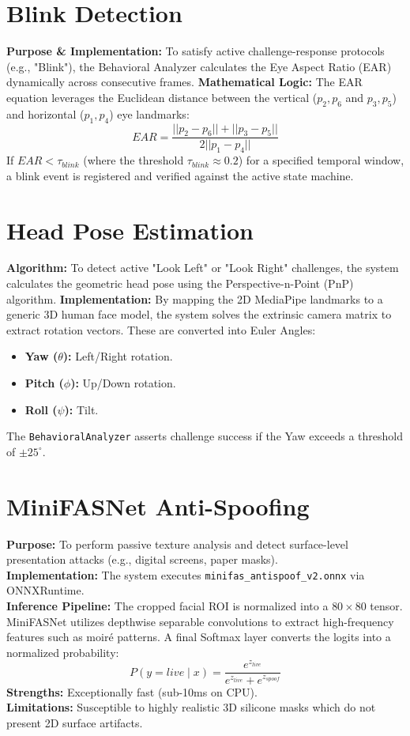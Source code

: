 \section{Blink Detection}
\textbf{Purpose \& Implementation:} To satisfy active challenge-response protocols (e.g., "Blink"), the Behavioral Analyzer calculates the Eye Aspect Ratio (EAR) dynamically across consecutive frames.
\textbf{Mathematical Logic:} The EAR equation leverages the Euclidean distance between the vertical ($p_2, p_6$ and $p_3, p_5$) and horizontal ($p_1, p_4$) eye landmarks:
\begin{equation}
EAR = \frac{||p_2 - p_6|| + ||p_3 - p_5||}{2 ||p_1 - p_4||}
\end{equation}
If $EAR < \tau_{blink}$ (where the threshold $\tau_{blink} \approx 0.2$) for a specified temporal window, a blink event is registered and verified against the active state machine.

\section{Head Pose Estimation}
\textbf{Algorithm:} To detect active "Look Left" or "Look Right" challenges, the system calculates the geometric head pose using the Perspective-n-Point (PnP) algorithm.
\textbf{Implementation:} By mapping the 2D MediaPipe landmarks to a generic 3D human face model, the system solves the extrinsic camera matrix to extract rotation vectors. These are converted into Euler Angles:
\begin{itemize}
    \item \textbf{Yaw ($\theta$):} Left/Right rotation.
    \item \textbf{Pitch ($\phi$):} Up/Down rotation.
    \item \textbf{Roll ($\psi$):} Tilt.
\end{itemize}
The \texttt{BehavioralAnalyzer} asserts challenge success if the Yaw exceeds a threshold of $\pm 25^{\circ}$.

\section{MiniFASNet Anti-Spoofing}
\textbf{Purpose:} To perform passive texture analysis and detect surface-level presentation attacks (e.g., digital screens, paper masks). \\
\textbf{Implementation:} The system executes \texttt{minifas\_antispoof\_v2.onnx} via ONNXRuntime. \\
\textbf{Inference Pipeline:} The cropped facial ROI is normalized into a $80 \times 80$ tensor. MiniFASNet utilizes depthwise separable convolutions to extract high-frequency features such as moiré patterns. A final Softmax layer converts the logits into a normalized probability:
\begin{equation}
P(y=live \mid x) = \frac{e^{z_{live}}}{e^{z_{live}} + e^{z_{spoof}}}
\end{equation}
\textbf{Strengths:} Exceptionally fast (sub-10ms on CPU). \\
\textbf{Limitations:} Susceptible to highly realistic 3D silicone masks which do not present 2D surface artifacts.

